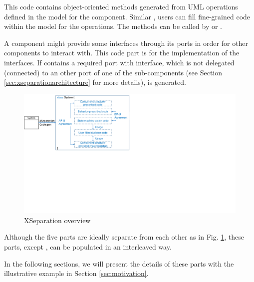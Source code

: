 \vskip 0.1cm
\noindent	
{} This code contains object-oriented methods generated from UML operations defined in the model for the component.
Similar , users can fill fine-grained code within the model for the operations.
The methods can be called by  or .

\vskip 0.1cm
\noindent	
{} A component might provide some interfaces through its ports in order for other components to interact with. 
This code part is for the implementation of the interfaces.
If  contains a required port with interface, which is not delegated (connected) to an other port of one of the sub-components (see Section \ref{sec:xseparationarchitecture} for more details),  is generated.  
	
 

\begin{figure}
	\centering
	\includegraphics[clip, trim=0cm 10cm 16.8cm 0cm, width=\columnwidth]{figures/xseparationoverview.pdf}
	\caption{XSeparation overview} 
	\label{fig:xseparationoverview}
\end{figure}

Although the five parts are ideally separate from each other as in Fig. \ref{fig:xseparationoverview}, these parts, except , can be populated in an interleaved way.

In the following sections, we will present the details of these parts with the illustrative example in Section \ref{sec:motivation}.

%